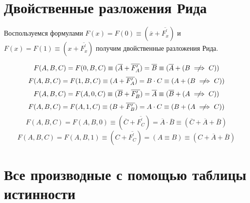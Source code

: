 \documentclass[a4paper,10pt]{article} %
\begin{document}
	\section{Двойственные разложения Рида}
		
	Воспользуемся формулами $F(x) = F(0) \equiv (\overline{x} + \overline{F_{x}^{\prime}})$ и $F(x) = F(1) \equiv (x + \overline{F_{x}^{\prime}})$ получим двойственные разложения Рида.
	
	\begin{equation}
		F(A, B, C) = F(0, B, C) \equiv (\overline{A} + \overline{F_{A}^{\prime}})
		= \overline{B} \equiv (\overline{A} + (B \centernot\implies C)) 
	\end{equation}
	\begin{equation}
		F(A, B, C) = F(1, B, C) \equiv (A + \overline{F_{A}^{\prime}}) =
		B \cdot C \equiv (A + (B \centernot\implies C))
	\end{equation}
	\begin{equation}
		F(A, B, C) = F(A, 0, C) \equiv (\overline{B} + \overline{F_{B}^{\prime}})
		= \overline{A} \equiv (\overline{B} + (A \centernot\implies C))
	\end{equation}
	\begin{equation}
		F(A, B, C) = F(A, 1, C) \equiv (B + \overline{F_{B}^{\prime}}) 
		= A \cdot C \equiv (B + (A \centernot\implies C))
	\end{equation}
	\begin{equation}
		F(A, B, C) = F(A, B, 0) \equiv (\overline{C} + \overline{F_{C}^{\prime}})
		= \overline{A} \cdot \overline{B} \equiv (\overline{C} + \overline{A} 
		+ \overline{B})
	\end{equation}
	\begin{equation}
		F(A, B, C) = F(A, B, 1) \equiv (C + \overline{F_{C}^{\prime}})
		= (A \equiv B) \equiv (C + \overline{A} + \overline{B})
	\end{equation}
		
	\section{Все производные с помощью таблицы истинности}
	
\end{document}
